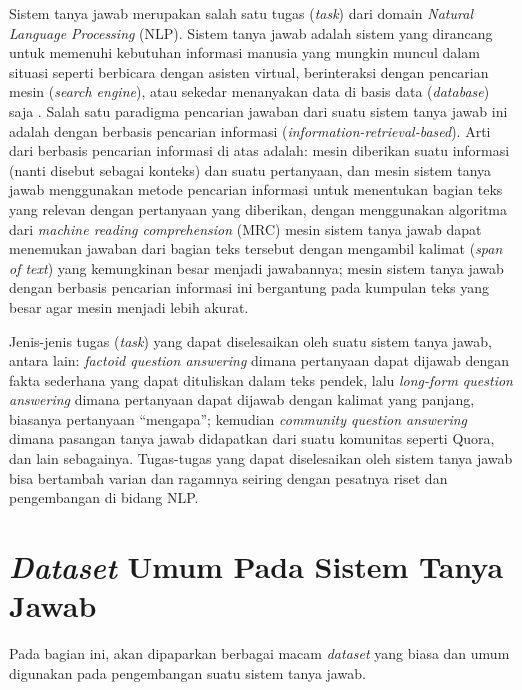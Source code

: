 Sistem tanya jawab merupakan salah satu tugas (\emph{task}) dari domain \emph{Natural Language Processing} (NLP). Sistem tanya jawab adalah sistem yang dirancang untuk memenuhi kebutuhan informasi manusia yang mungkin muncul dalam situasi seperti berbicara dengan asisten virtual, berinteraksi dengan pencarian mesin (\emph{search engine}), atau sekedar menanyakan data di basis data (\emph{database}) saja \citep{daniel2007speech}. Salah satu paradigma pencarian jawaban dari suatu sistem tanya jawab ini adalah dengan berbasis pencarian informasi (\emph{information-retrieval-based}). Arti dari berbasis pencarian informasi di atas adalah: mesin diberikan suatu informasi (nanti disebut sebagai konteks) dan suatu pertanyaan, dan mesin sistem tanya jawab menggunakan metode pencarian informasi untuk menentukan bagian teks yang relevan dengan pertanyaan yang diberikan, dengan menggunakan algoritma dari \emph{machine reading comprehension} (MRC) mesin sistem tanya jawab dapat menemukan jawaban dari bagian teks tersebut dengan mengambil kalimat (\emph{span of text}) yang kemungkinan besar menjadi jawabannya; mesin sistem tanya jawab dengan berbasis pencarian informasi ini bergantung pada kumpulan teks yang besar agar mesin menjadi lebih akurat. 

Jenis-jenis tugas (\emph{task}) yang dapat diselesaikan oleh suatu sistem tanya jawab, antara lain: \emph{factoid question answering} dimana pertanyaan dapat dijawab dengan fakta sederhana yang dapat dituliskan dalam teks pendek, lalu \emph{long-form question answering} dimana pertanyaan dapat dijawab dengan kalimat yang panjang, biasanya pertanyaan “mengapa”; kemudian \emph{community question answering} dimana pasangan tanya jawab didapatkan dari suatu komunitas seperti Quora, dan lain sebagainya. Tugas-tugas yang dapat diselesaikan oleh sistem tanya jawab bisa bertambah varian dan ragamnya seiring dengan pesatnya riset dan pengembangan di bidang NLP.

\section{\emph{Dataset} Umum Pada Sistem Tanya Jawab}
\label{2.2}
Pada bagian ini, akan dipaparkan berbagai macam \emph{dataset} yang biasa dan umum digunakan pada pengembangan suatu sistem tanya jawab.

